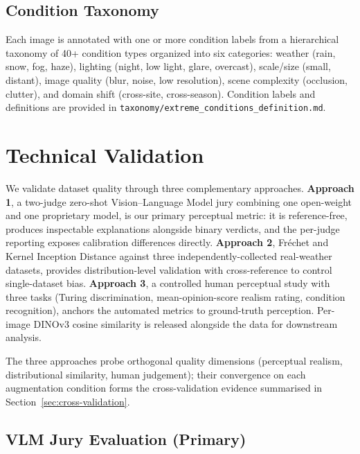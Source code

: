 \documentclass[12pt]{article}
\begin{document}
\subsection{Condition Taxonomy}

Each image is annotated with one or more condition labels from a hierarchical taxonomy of 40+ condition types organized into six categories: weather (rain, snow, fog, haze), lighting (night, low light, glare, overcast), scale/size (small, distant), image quality (blur, noise, low resolution), scene complexity (occlusion, clutter), and domain shift (cross-site, cross-season). Condition labels and definitions are provided in \texttt{taxonomy/extreme\_conditions\_definition.md}.


\section{Technical Validation}

We validate dataset quality through three complementary approaches. \textbf{Approach 1}, a two-judge zero-shot Vision--Language Model jury combining one open-weight and one proprietary model, is our primary perceptual metric: it is reference-free, produces inspectable explanations alongside binary verdicts, and the per-judge reporting exposes calibration differences directly. \textbf{Approach 2}, Fr\'echet and Kernel Inception Distance against three independently-collected real-weather datasets, provides distribution-level validation with cross-reference to control single-dataset bias. \textbf{Approach 3}, a controlled human perceptual study with three tasks (Turing discrimination, mean-opinion-score realism rating, condition recognition), anchors the automated metrics to ground-truth perception. Per-image DINOv3 cosine similarity is released alongside the data for downstream analysis.

The three approaches probe orthogonal quality dimensions (perceptual realism, distributional similarity, human judgement); their convergence on each augmentation condition forms the cross-validation evidence summarised in Section~\ref{sec:cross-validation}.

\subsection{VLM Jury Evaluation (Primary)}
\label{sec:vlm-jury}
\end{document}

